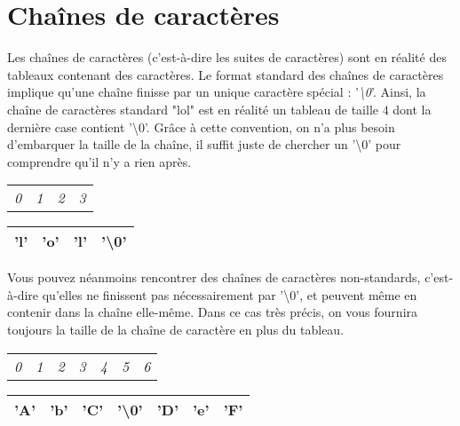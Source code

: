 \documentclass[11pt,a4paper]{article}
\begin{document}
\clearpage


\section{Chaînes de caractères}

Les chaînes de caractères (c'est-à-dire les suites de caractères) sont en réalité des tableaux contenant des caractères.
Le format standard des chaînes de caractères implique qu'une chaîne finisse par un unique caractère spécial : '\textit{\textbackslash 0}'.
Ainsi, la chaîne de caractères standard "lol" est en réalité un tableau de taille $ 4 $ dont la dernière case contient '\textbackslash 0'.
Grâce à cette convention, on n'a plus besoin d'embarquer la taille de la chaîne, il suffit juste de chercher un '\textbackslash 0' pour comprendre qu'il n'y a rien après.

\bigskip

\begin{table}[h!]
  \centering
  \begin{tabular}{ C{0.7cm} C{0.7cm} C{0.7cm} C{0.7cm} }
\textit{0} & \textit{1} & \textit{2} & \textit{3} \\
  \end{tabular}

  \begin{tabular}{| C{0.7cm} | C{0.7cm} | C{0.7cm} | C{0.7cm} |}
  \hline
'l' & 'o' & 'l' & '\textbackslash 0' \\
  \hline
  \end{tabular}
\end{table}

\bigskip

Vous pouvez néanmoins rencontrer des chaînes de caractères non-standards, c'est-à-dire qu'elles ne finissent pas nécessairement par '\textbackslash 0', et peuvent même en contenir dans la chaîne elle-même.
Dans ce cas très précis, on vous fournira toujours la taille de la chaîne de caractère en plus du tableau.

\bigskip

\begin{table}[h!]
  \centering
  \begin{tabular}{ C{0.7cm} C{0.7cm} C{0.7cm} C{0.7cm} C{0.7cm} C{0.7cm} C{0.7cm} }
\textit{0} & \textit{1} & \textit{2} & \textit{3} & \textit{4} & \textit{5} & \textit{6} \\
  \end{tabular}

  \begin{tabular}{| C{0.7cm} | C{0.7cm} | C{0.7cm} | C{0.7cm} | C{0.7cm} | C{0.7cm} | C{0.7cm} |}
  \hline
'A' & 'b' & 'C' & '\textbackslash 0' & 'D' & 'e' & 'F' \\
  \hline
  \end{tabular}
\end{table}
\end{document}
